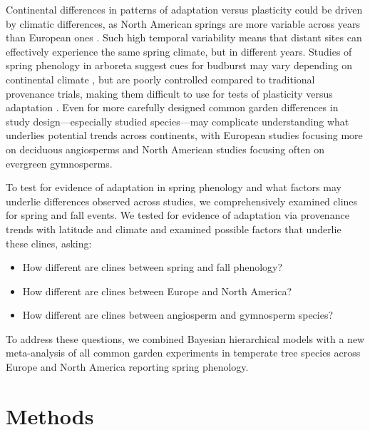 \documentclass{article}
\begin{document}
Continental differences in patterns of adaptation versus plasticity could be driven by climatic differences, as North American springs are more variable across years than European ones \citep{tward21,zohner2017,schwartz00}. Such high temporal variability means that distant sites can effectively experience the same spring climate, but in different years. Studies of spring phenology in arboreta suggest cues for budburst may vary depending on continental climate \citep{zohner2017}, but are poorly controlled compared to traditional provenance trials, making them difficult to use for tests of plasticity versus adaptation \citep{gauzere2020}. Even for more carefully designed common garden differences in study design---especially studied species---may complicate understanding what underlies potential trends across continents, with European studies focusing more on deciduous angiosperms and North American studies focusing often on evergreen gymnosperms.  

To test for evidence of adaptation in spring phenology and what factors may underlie differences observed across studies, we comprehensively examined clines for spring and fall events. We tested for evidence of adaptation via provenance trends with latitude and climate and examined possible factors that underlie these clines, asking:
\begin{itemize}
\item How different are clines between spring and fall phenology? 
\item How different are clines between Europe and North America?
\item How different are clines between angiosperm and gymnosperm species?
\end{itemize}
To address these questions, we combined Bayesian hierarchical models with a new meta-analysis of all common garden experiments in temperate tree species across Europe and North America reporting spring phenology. 

\section{Methods}
\end{document}

